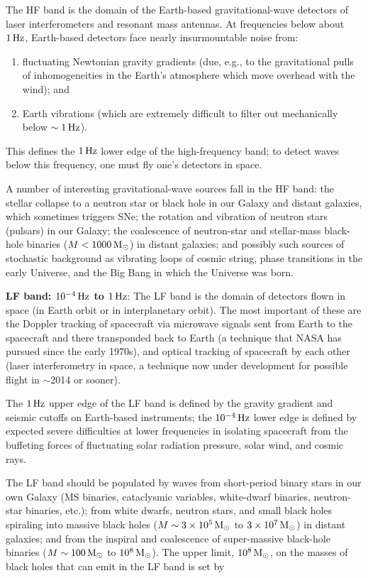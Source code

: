 \documentclass[a4paper,10pt]{article}
\begin{document}
{\noindent}The HF band is the domain of the Earth-based gravitational-wave detectors of laser interferometers and resonant mass antennas. At frequencies below about $1\,{\rm Hz}$, Earth-based detectors face nearly insurmountable noise from:

\begin{enumerate}
    \item fluctuating Newtonian gravity gradients (due, e.g., to the gravitational pulls of inhomogeneities in the Earth's atmosphere which move overhead with the wind); and
    \item Earth vibrations (which are extremely difficult to filter out mechanically below $\sim1\,{\rm Hz}$).
\end{enumerate}

{\noindent}This defines the $1\,{\rm Hz}$ lower edge of the high-frequency band; to detect waves below this frequency, one must fly one's detectors in space.

{\noindent}A number of interesting gravitational-wave sources fall in the HF band: the stellar collapse to a neutron star or black hole in our Galaxy and distant galaxies, which sometimes triggers SNe; the rotation and vibration of neutron stars (pulsars) in our Galaxy; the coalescence of neutron-star and stellar-mass black-hole binaries ($M<1000\,{\rm M_\odot}$) in distant galaxies; and possibly such sources of stochastic background as vibrating loops of cosmic string, phase transitions in the early Universe, and the Big Bang in which the Universe was born.

{\noindent}\textbf{LF band: $10^{-4}\,{\rm Hz}$ to $1\,{\rm Hz}$}: The LF band is the domain of detectors flown in space (in Earth orbit or in interplanetary orbit). The most important of these are the Doppler tracking of spacecraft via microwave signals sent from Earth to the spacecraft and there transponded back to Earth (a technique that NASA has pursued since the early 1970s), and optical tracking of spacecraft by each other (laser interferometry in space, a technique now under development for possible flight in $\sim$2014 or sooner).

{\noindent}The $1\,{\rm Hz}$ upper edge of the LF band is defined by the gravity gradient and seismic cutoffs on Earth-based instruments; the  $10^{-4}\,{\rm Hz}$ lower edge is defined by expected severe difficulties at lower frequencies in isolating spacecraft from the buffeting forces of fluctuating solar radiation pressure, solar wind, and cosmic rays.

{\noindent}The LF band should be populated by waves from short-period binary stars in our own Galaxy (MS binaries, cataclysmic variables, white-dwarf binaries, neutron-star binaries, etc.); from white dwarfs, neutron stars, and small black holes spiraling into massive black holes ($M\sim3\times10^5\,{\rm M_\odot}$ to $3\times10^7\,{\rm M_\odot}$) in distant galaxies; and from the inspiral and coalescence of super-massive black-hole binaries ($M\sim100\,{\rm M_\odot}$ to $10^8\,{\rm M_\odot}$). The upper limit, $10^8\,{\rm M_\odot}$, on the masses of black holes that can emit in the LF band is set by 
\end{document}
